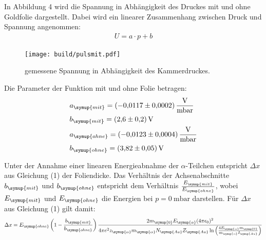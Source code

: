 In Abbildung 4 wird  die Spannung in Abhängigkeit des Druckes mit und ohne Goldfolie dargestellt. Dabei wird ein linearer
Zusammenhang zwischen Druck und Spannung angenommen:
\begin{align*}
  U = a \cdot p + b
\end{align*}

\begin{figure}[H]
  \centering
  \texttt{[image: build/pulsmit.pdf]}
  \caption{gemessene Spannung in Abhängigkeit des Kammerdruckes.}
  \label{fig:ohne}
\end{figure}

Die Parameter der Funktion mit und ohne Folie betragen:
\begin{align*}
  &a_{\symup{mit}} = \SI{-0.0117(2)}{\volt\per\milli\bar}  \\
  &b_{\symup{mit}} = \SI{2.6(2)}{\volt}  \\
  &a_{\symup{ohne}}= \SI{-0.0123(4)}{\volt\per\milli\bar}  \\
  &b_{\symup{ohne}} = \SI{ 3.82(5)}{\volt} \\
\end{align*}

Unter der Annahme einer linearen Energieabnahme der $\alpha$-Teilchen entspricht $\Delta x$ aus Gleichung (1) der Foliendicke.
Das Verhältnis der Achsenabschnitte $b_{\symup{mit}}$ und $b_{\symup{ohne}}$ entspricht dem Verhältnis $\frac{E_{\symup{mit}}}{E_{\symup{ohne}}}$, wobei
$E_{\symup{mit}}$ und $E_{\symup{ohne}}$ die Energien bei $p=\SI{0}{\milli\bar}$ darstellen.
Für $\Delta x$ aus Gleichung (1) gilt damit:
\begin{align}
  \Delta x = E_{\symup{ohne}} \left(1- \frac{b_{\symup{mit}}}{b_{\symup{ohne}}}\right) \frac{2 m_{\symup{0}} E_{\symup{\alpha}} (4 \pi \epsilon_0)^2}{4 \pi e^2 z_{\symup{\alpha}}  m_{\symup{\alpha}} N_{\symup{Au}} Z_{\symup{Au}} \ln{\left(\frac{4 E_{\symup{\alpha}} m_{\symup{0}}}{m_{\symup{\alpha}} I_{\symup{Au}}}\right)}}
\end{align}

